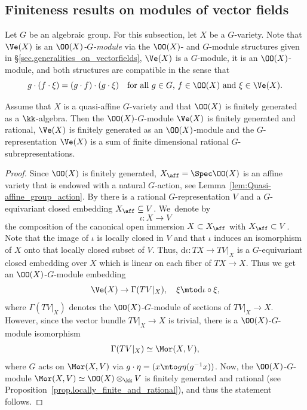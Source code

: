 \subsection{Finiteness results on modules of vector fields}

Let $G$ be an algebraic group. For this subsection, let $X$ be a $G$-variety.
Note that $\Ve(X)$ is an
\emph{$\OO(X)$-$G$-module} via the $\OO(X)$- and $G$-module structures given in \S\ref{sec.generalities_on_vectorfields},
\ie $\Ve(X)$ is a $G$-module, it is an $\OO(X)$-module,
and both structures are compatible in the sense that
\[
g \cdot (f \cdot \xi) = (g \cdot f) \cdot (g \cdot \xi) \quad
\textrm{for all $g \in G$, $f \in \OO(X)$ and $\xi \in \Ve(X)$.}
\]

\begin{lemma}
\label{lem.finiteness_and_rationality_of_VecX}
Assume that $X$ is a quasi-affine $G$-variety and that $\OO(X)$ is finitely generated as a $\kk$-algebra.
Then the $\OO(X)$-$G$-module $\Ve(X)$ is finitely generated and rational,
\ie $\Ve(X)$ is finitely generated as an $\OO(X)$-module
and the $G$\nobreakdash-repre\-sentation $\Ve(X)$ is a sum of finite dimensional
rational $G$-subrepresentations.
\end{lemma}

\begin{proof}
Since $\OO(X)$ is finitely generated, $X_{\aff} = \Spec \OO(X)$ is an affine variety
that is endowed with a natural $G$-action, see Lemma~\ref{lem:Quasi-affine_group_action}. By
\cite[Satz\,2, II.2.S]{Kr1984Geometrische-Metho} there is a rational $G$-representation $V$ and a $G$-equivariant
closed embedding $X_{\aff} \subseteq V$. We~denote by
\[
\iota \colon X \to V
\]
the composition of the canonical open immersion $X \subset X_{\aff}$ with $X_{\aff} \subset V$.
Note that the image of $\iota$ is locally closed in $V$ and that $\iota$ induces
an isomorphism of $X$ onto that locally closed subset of $V$.
Thus, $\mathrm{d} \iota \colon T X \to T V |_X$ is a $G$-equivariant closed
embedding over $X$ which is linear on each fiber of $T X \to X$.
Thus we get an $\OO(X)$-$G$-module embedding
\[
\Ve(X) \to \Gamma(TV |_X), \quad
\xi \mto \mathrm{d} \iota \circ \xi,
\]
where $\Gamma(TV |_X)$ denotes the $\OO(X)$-$G$-module
of sections of $TV |_X \to X$. However, since the vector bundle
$TV |_X \to X$ is trivial, there is a
$\OO(X)$-$G$-module isomorphism
\[
\Gamma(TV |_X) \simeq \Mor(X, V),
\]
where $G$ acts on $\Mor(X, V)$ via $g \cdot \eta = (x \mto g\eta(g^{-1}x))$.
Now, the $\OO(X)$-$G$-module
$\Mor(X, V) \simeq \OO(X) \otimes_{\kk} V$ is finitely generated and
rational (see Proposition~\ref{prop.locally_finite_and_rational}),
and thus the statement follows.
\end{proof}

